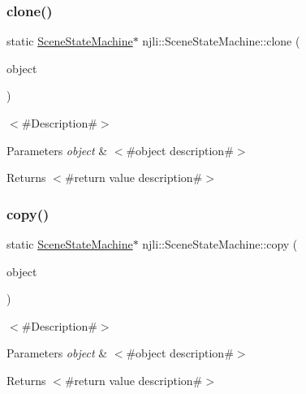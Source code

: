 \subsubsection{\texorpdfstring{clone()}{clone()}}
{\footnotesize\ttfamily static \mbox{\hyperlink{classnjli_1_1_scene_state_machine}{Scene\+State\+Machine}}$\ast$ njli\+::\+Scene\+State\+Machine\+::clone (\begin{DoxyParamCaption}\item[{const \mbox{\hyperlink{classnjli_1_1_scene_state_machine}{Scene\+State\+Machine}} \&}]{object }\end{DoxyParamCaption})\hspace{0.3cm}{\ttfamily [static]}}

$<$\#\+Description\#$>$


\begin{DoxyParams}{Parameters}
{\em object} & $<$\#object description\#$>$\\
\hline
\end{DoxyParams}
\begin{DoxyReturn}{Returns}
$<$\#return value description\#$>$ 
\end{DoxyReturn}
\mbox{\label{classnjli_1_1_scene_state_machine_a123b3de15599ad532fd6e7ab3341bab0}} 
\subsubsection{\texorpdfstring{copy()}{copy()}}
{\footnotesize\ttfamily static \mbox{\hyperlink{classnjli_1_1_scene_state_machine}{Scene\+State\+Machine}}$\ast$ njli\+::\+Scene\+State\+Machine\+::copy (\begin{DoxyParamCaption}\item[{const \mbox{\hyperlink{classnjli_1_1_scene_state_machine}{Scene\+State\+Machine}} \&}]{object }\end{DoxyParamCaption})\hspace{0.3cm}{\ttfamily [static]}}

$<$\#\+Description\#$>$


\begin{DoxyParams}{Parameters}
{\em object} & $<$\#object description\#$>$\\
\hline
\end{DoxyParams}
\begin{DoxyReturn}{Returns}
$<$\#return value description\#$>$ 
\end{DoxyReturn}
\mbox{\label{classnjli_1_1_scene_state_machine_aa6763773b5a04f92920c7965db0bd1b9}} 
